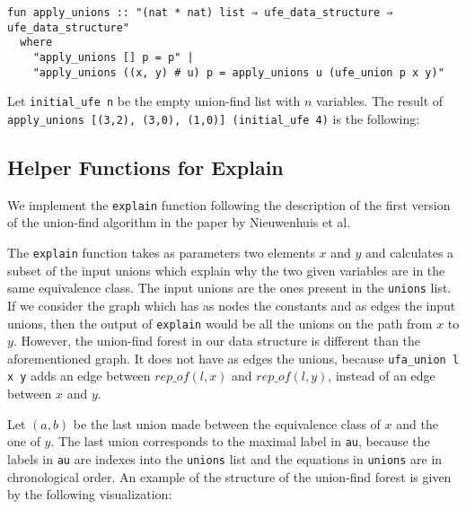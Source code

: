 \begin{lstlisting}
fun apply_unions :: "(nat * nat) list ⇒ ufe_data_structure ⇒ ufe_data_structure"
  where
    "apply_unions [] p = p" |
    "apply_unions ((x, y) # u) p = apply_unions u (ufe_union p x y)"
\end{lstlisting}

\begin{exmp}\label{example:apply-unions}
Let \lstinline|initial_ufe n| be the empty union-find list with $n$ variables. The result of \lstinline|apply_unions [(3,2), (3,0), (1,0)] (initial_ufe 4)| is the following:

\begin{center}
\end{center}
\end{exmp}

\subsection{Helper Functions for Explain}\label{subsection:helper-functions}

We implement the \lstinline|explain| function following the description of the first version of the union-find algorithm in the paper by Nieuwenhuis et al. \cite{Nieuwenhuis}

The \lstinline|explain| function takes as parameters two elements $x$ and $y$ and calculates a subset of the input unions which explain why the two given variables are in the same equivalence class. The input unions are the ones present in the \lstinline|unions| list. If we consider the graph which has as nodes the constants and as edges the input unions, then the output of \lstinline|explain| would be all the unions on the path from $x$ to $y$. However, the union-find forest in our data structure is different than the aforementioned graph. It does not have as edges the unions, because \lstinline|ufa_union l x y| adds an edge between $rep\_of(l, x)$ and $rep\_of(l, y)$, instead of an edge between $x$ and $y$.

Let $(a, b)$ be the last union made between the equivalence class of $x$ and the one of $y$.
The last union corresponds to the maximal label in \lstinline|au|, because the labels in \lstinline|au| are indexes into the \lstinline|unions| list and the equations in \lstinline|unions| are in chronological order.
An example of the structure of the union-find forest is given by the following visualization:

